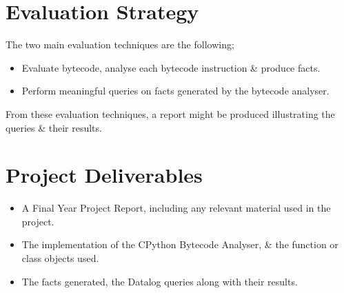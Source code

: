 \documentclass[12pt, a4paper]{report}
\theoremstyle{definition}
\theoremstyle{definition}%
\theoremstyle{definition}%
\theoremstyle{definition}%
\theoremstyle{definition}%
\theoremstyle{definition}%
\begin{document}
\chapter{Evaluation Strategy}
\par The two main evaluation techniques are the following;
    \begin{itemize}
        \item Evaluate bytecode, analyse each bytecode instruction \& produce facts.
        \item Perform meaningful queries on facts generated by the bytecode analyser.
    \end{itemize}

    From these evaluation techniques, a report might be produced illustrating the queries \& their results.

\chapter{Project Deliverables}

    \begin{itemize}
        \item A Final Year Project Report, including any relevant material used in the project.
        \item The implementation of the CPython Bytecode Analyser, \& the function or class objects used.
        \item The facts generated, the Datalog queries along with their results.
    \end{itemize}

\bibliomatter




    
 
        \cite{nielson2004principles}
        \cite{bruegge1993framework}
        \cite{moller2012static}
        \cite{pyStat}
        \cite{aycock1998converting}
        \cite{ike2015inside}
        \cite{disModule}
        \cite{jordan2016souffle}
        \cite{varAwareDlog}
\end{document}
